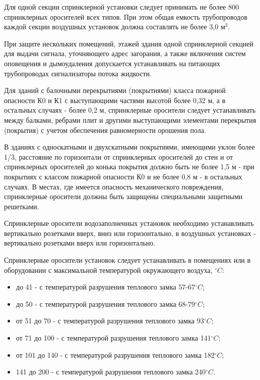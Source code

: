 Для одной секции спринклерной установки\cite{bjd421} \cite{bjd422} следует принимать не более 800 спринклерных оросителей всех типов.
При этом общая емкость трубопроводов каждой секции воздушных установок должна составлять не более 3,0 м$^3$.

При защите нескольких помещений, этажей здания одной спринклерной секцией для выдачи сигнала, уточняющего адрес загорания, а также
включения систем оповещения и дымоудаления допускается устанавливать на питающих трубопроводах сигнализаторы потока жидкости.
 
Для зданий с балочными перекрытиями (покрытиями) класса пожарной опасности К0 и К1 с выступающими частями высотой более 0,32 м, а
в остальных случаях - более 0,2 м, спринклерные оросители следует устанавливать между балками, ребрами плит и другими выступающими
элементами перекрытия (покрытия) с учетом обеспечения равномерности орошения пола.
 
В зданиях с односкатными и двухскатными покрытиями, имеющими уклон более 1/3, расстояние по горизонтали от спринклерных оросителей
до стен и от спринклерных оросителей до конька покрытия должно быть не более 1,5 м - при покрытиях с классом пожарной опасности
К0 и не более 0,8 м - в остальных случаях. В местах, где имеется опасность механического повреждения, спринклерные оросители
должны быть защищены специальными защитными решетками.
 
Спринклерные оросители водозаполненных установок необходимо устанавливать вертикально розетками вверх, вниз или горизонтально,
в воздушных установках - вертикально розетками вверх или горизонтально.

Спринклерные оросители установок следует устанавливать в помещениях или в оборудовании с максимальной температурой окружающего воздуха,
${^\circ{C}}$:
\begin{itemize}
\item до 41 - с температурой разрушения теплового замка 57-67${^\circ{C}}$;
\item до 50 - с температурой разрушения теплового замка 68-79${^\circ{C}}$;
\item от 51 до 70 - с температурой разрушения теплового замка 93${^\circ{C}}$;
\item от 71 до 100 - с температурой разрушения теплового замка 141${^\circ{C}}$;
\item от 101 до 140 - с температурой разрушения теплового замка 182${^\circ{C}}$;
\item 141 до 200 - с температурой разрушения теплового замка 240${^\circ{C}}$.
\end{itemize}
 
